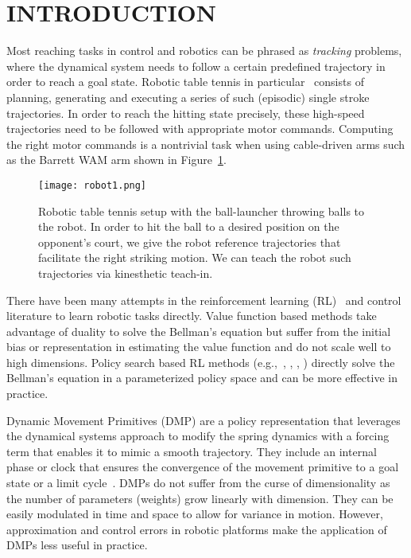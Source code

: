 \section{INTRODUCTION}\label{introduction}


Most reaching tasks in control and robotics can be phrased as \emph{tracking} problems, where the dynamical system needs to follow a certain predefined trajectory in order to reach a goal state. Robotic table tennis in particular~\cite{Muelling13} consists of planning, generating and executing a series of such (episodic) single stroke trajectories. In order to reach the hitting state precisely, these high-speed trajectories need to be followed with appropriate motor commands. Computing the right motor commands is a nontrivial task when using cable-driven arms such as the Barrett WAM arm shown in Figure~\ref{robot}.

\begin{figure}[t!]
\center
\texttt{[image: robot1.png]}			
\caption{Robotic table tennis setup with the ball-launcher throwing balls to the robot. In order to hit the ball to a desired position on the opponent's court, we give the robot reference trajectories that facilitate the right striking motion. We can teach the robot such trajectories via kinesthetic teach-in.}
\label{robot}
\end{figure}

There have been many attempts in the reinforcement learning (RL)~\cite{Sutton98} and control literature to learn robotic tasks directly. Value function based methods take advantage of duality to solve the Bellman's equation but suffer from the initial bias or representation in estimating the value function and do not scale well to high dimensions. Policy search based RL methods (e.g.,~\cite{Kober08}, \cite{Peter10}, \cite{Theodorou10}, \cite{Deisenroth11}) directly solve the Bellman's equation in a parameterized policy space and can be more effective in practice. 

Dynamic Movement Primitives (DMP) are a policy representation that leverages the dynamical systems approach to modify the spring dynamics with a forcing term that enables it to mimic a smooth trajectory. They include an internal phase or clock that ensures the convergence of the movement primitive to a goal state or a limit cycle~\cite{Ijspeert13}. DMPs do not suffer from the curse of dimensionality as the number of parameters (weights) grow linearly with dimension. They can be easily modulated in time and space to allow for variance in motion. However, approximation and control errors in robotic platforms make the application of DMPs less useful in practice. %

